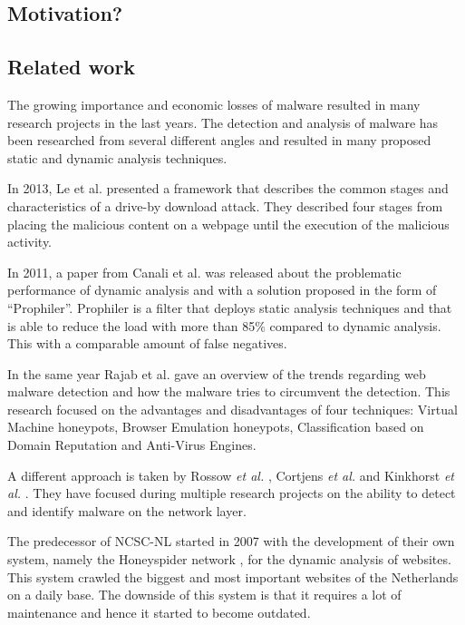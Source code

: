 \subsection{Motivation?}

\subsection{Related work}

The growing importance and economic losses of malware resulted in many research projects in the last years. The detection and analysis of malware has been researched from several different angles \cite{auto_malware,Chang2013} and resulted in many proposed static and dynamic analysis techniques.

In 2013, Le et al. \cite{Le2013} presented a framework that describes the common stages and characteristics of a drive-by download attack. They described four stages from placing the malicious content on a webpage until the execution of the malicious activity.

In 2011, a paper from Canali et al. \cite{Canali2011} was released about the problematic performance of dynamic analysis and with a solution proposed in the form of ``Prophiler''. Prophiler is a filter that deploys static analysis techniques and that is able to reduce the load with more than 85\% compared to dynamic analysis. This with a comparable amount of false negatives.

In the same year Rajab et al. \cite{Rajab11trendsin} gave an overview of the trends regarding web malware detection and how the malware tries to circumvent the detection. This research focused on the advantages and disadvantages of four techniques: Virtual Machine honeypots, Browser Emulation honeypots, Classification based on Domain Reputation and Anti-Virus Engines.

A different approach is taken by Rossow \textit{et al.} \cite{Rossow2011}, Cortjens \textit{et al.} \cite{Cortjens2012} and Kinkhorst \textit{et al.} \cite{Kinkhorst2009}. They have focused during multiple research projects on the ability to detect and identify malware on the network layer.

The predecessor of NCSC-NL started in 2007 with the development of their own system, namely the Honeyspider network \cite{honeyspider}, for the dynamic analysis of websites. This system crawled the biggest and most important websites of the Netherlands on a daily base. The downside of this system is that it requires a lot of maintenance and hence it started to become outdated.

